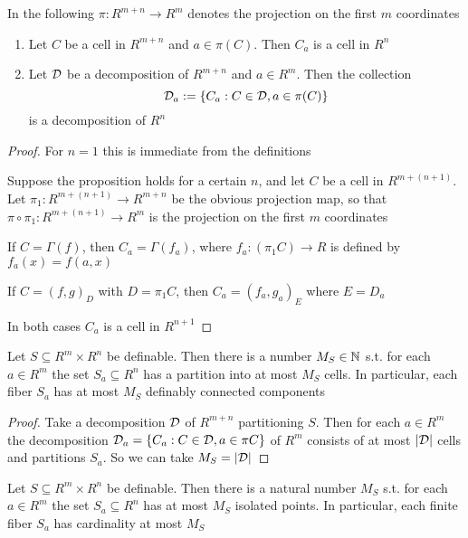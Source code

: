 \documentclass[11pt]{article}
\begin{document}
In the following \(\pi:R^{m+n}\to R^m\) denotes the projection on the first \(m\) coordinates

\begin{proposition}[]
\begin{enumerate}
\item Let \(C\) be a cell in \(R^{m+n}\) and \(a\in\pi(C)\). Then \(C_a\) is a cell in \(R^n\)
\item Let \(\mathcal{D}\) be a decomposition of \(R^{m+n}\) and \(a\in R^m\). Then the collection
\begin{equation*}
\mathcal{D}_a:=\{C_a:C\in\mathcal{D},a\in\pi(C)\}
\end{equation*}
is a decomposition of \(R^n\)
\end{enumerate}
\end{proposition}

\begin{proof}
For \(n=1\) this is immediate from the definitions

Suppose the proposition holds for a certain \(n\), and let \(C\) be a cell in \(R^{m+(n+1)}\).
Let \(\pi_1:R^{m+(n+1)}\to R^{m+n}\) be the obvious projection map, so that \(\pi\circ\pi_1:R^{m+(n+1)}\to R^m\)
is the projection on the first \(m\) coordinates

If \(C=\Gamma(f)\), then \(C_a=\Gamma(f_a)\), where \(f_a:(\pi_1C)\to R\) is defined by \(f_a(x)=f(a,x)\)

If \(C=(f,g)_D\) with \(D=\pi_1C\), then \(C_a=(f_a,g_a)_E\) where \(E=D_a\)

In both cases \(C_a\) is a cell in \(R^{n+1}\)
\end{proof}

\begin{corollary}[]
Let \(S\subseteq R^m\times R^n\) be definable. Then there is a number \(M_S\in\mathbb{N}\) s.t. for each \(a\in R^m\) the
set \(S_a\subseteq R^n\) has a partition into at most \(M_S\) cells. In particular, each fiber \(S_a\) has
at most \(M_S\) definably connected components
\end{corollary}

\begin{proof}
Take a decomposition \(\mathcal{D}\) of \(R^{m+n}\) partitioning \(S\). Then for each \(a\in R^m\) the
decomposition \(\mathcal{D}_a=\{C_a:C\in\mathcal{D},a\in\pi C\}\) of \(R^m\) consists of at most \(\abs{\cald}\) cells and
partitions \(S_a\). So we can take \(M_S=\abs{\cald}\)
\end{proof}

\begin{corollary}[]
Let \(S\subseteq R^m\times R^n\) be definable. Then there is a natural number \(M_S\) s.t. for each \(a\in R^m\)
the set \(S_a\subseteq R^n\) has at most \(M_S\) isolated points. In particular, each finite fiber \(S_a\)
has cardinality at most \(M_S\)
\end{corollary}
\end{document}
